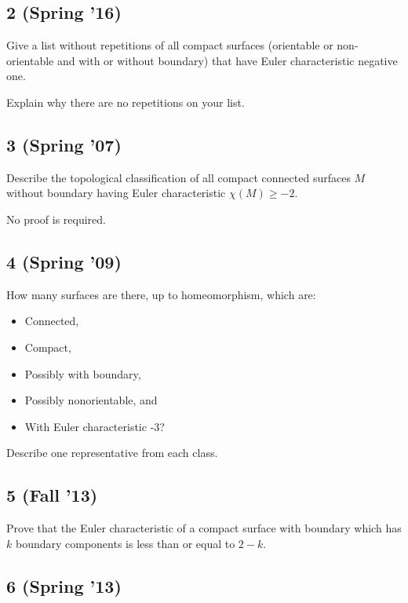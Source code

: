 \hypertarget{spring-16-2}{%
\subsection{2 (Spring '16)}\label{spring-16-2}}

Give a list without repetitions of all compact surfaces (orientable or
non-orientable and with or without boundary) that have Euler
characteristic negative one.

Explain why there are no repetitions on your list.

\hypertarget{spring-07-3}{%
\subsection{3 (Spring '07)}\label{spring-07-3}}

Describe the topological classification of all compact connected
surfaces \(M\) without boundary having Euler characteristic
\(\chi(M )\geq -2\).

No proof is required.

\hypertarget{spring-09-7}{%
\subsection{4 (Spring '09)}\label{spring-09-7}}

How many surfaces are there, up to homeomorphism, which are:

\begin{itemize}
\tightlist
\item
  Connected,
\item
  Compact,
\item
  Possibly with boundary,
\item
  Possibly nonorientable, and
\item
  With Euler characteristic -3?
\end{itemize}

Describe one representative from each class.

\hypertarget{fall-13}{%
\subsection{5 (Fall '13)}\label{fall-13}}

Prove that the Euler characteristic of a compact surface with boundary
which has \(k\) boundary components is less than or equal to \(2 - k\).

\hypertarget{spring-13-4}{%
\subsection{6 (Spring '13)}\label{spring-13-4}}


